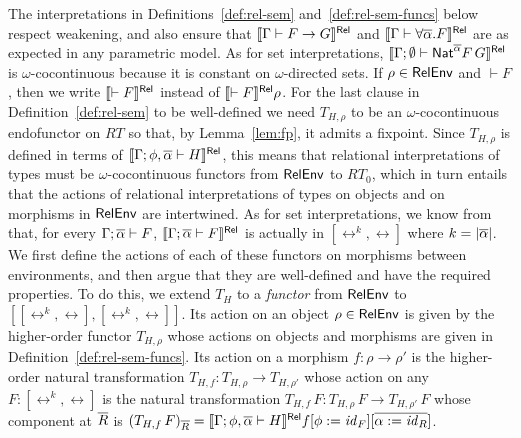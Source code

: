 \documentclass{lmcs}
\theoremstyle{plain}\newtheorem{satz}[thm]{Satz}
\renewcommand{\id}{\mathit{id}}
\begin{document}
The interpretations in Definitions~\ref{def:rel-sem}
and~\ref{def:rel-sem-funcs} below respect weakening, and also ensure
that $\llbracket{\Gamma \vdash F \to G}\rrbracket^{\mathsf{Rel}}$ and $\llbracket{\Gamma \vdash
  \forall \overline{\alpha}. F}\rrbracket^{\mathsf{Rel}}$ are as expected in any parametric model.  As
for set interpretations, $\llbracket{\Gamma; \emptyset \vdash
  \mathsf{Nat}^{\overline{\alpha}} F\,G}\rrbracket^{\mathsf{Rel}}$ is $\omega$-cocontinuous because it is
constant on $\omega$-directed sets. If $\rho \in \mathsf{RelEnv}$ and $\vdash
F$, then we write $\llbracket{\vdash F}\rrbracket^{\mathsf{Rel}}$ instead of $\llbracket{\vdash
  F}\rrbracket^{\mathsf{Rel}}\rho$.  For the last clause in Definition~\ref{def:rel-sem} to be
well-defined we need $T_{H,\rho}$ to be an $\omega$-cocontinuous
endofunctor on $RT$ so that, by Lemma~\ref{lem:fp}, it admits a
fixpoint. Since $T_{H,\rho}$ is defined in terms of
$\llbracket{\Gamma;\phi, \overline{\alpha} \vdash H}\rrbracket^{\mathsf{Rel}}$, this means
that relational interpretations of types must be $\omega$-cocontinuous
functors from $\mathsf{RelEnv}$ to $RT_0$, which in turn entails that the
actions of relational interpretations of types on objects and on
morphisms in $\mathsf{RelEnv}$ are intertwined. As for set interpretations, we
know from~\cite{jp19} that, for every $\Gamma; \overline{\alpha} \vdash F$,
$\llbracket{\Gamma; \overline{\alpha} \vdash F}\rrbracket^{\mathsf{Rel}}$ is actually in $[\rel^k,\rel]$
where $k = |\overline{\alpha}|$. We first define the actions of each of these
functors on morphisms between environments, and then argue that they
are well-defined and have the required properties. To do this, we
extend $T_H$ to a {\em functor} from $\mathsf{RelEnv}$ to
$[[\rel^k,\rel],[\rel^k,\rel]]$. Its action on an object $\rho \in
\mathsf{RelEnv}$ is given by the higher-order functor $T_{H,\rho}$ whose
actions on objects and morphisms are given in
Definition~\ref{def:rel-sem-funcs}. Its action on a morphism $f : \rho
\to \rho'$ is the higher-order natural transformation $T_{H,f} :
T_{H,\rho} \to T_{H,\rho'}$ whose action on any $F : [\rel^k,\rel]$ is
the natural transformation $T_{H,f}\, F : T_{H,\rho}\, F \to
T_{H,\rho'}\, F$ whose component at $\overline{R}$ is $(T_{H,f}\,
F)_{\ol{R}} = \relsem{\Gamma; \phi,\ol{\alpha} \vdash
  H}f[\phi := \id_F][\ol{\alpha := \id_R}]$.
\end{document}
